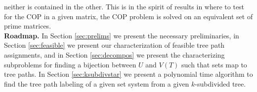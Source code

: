 \documentclass{fsttcs}
\def\cH{{\cal H}}
\def\F{{\mathcal F}}
\begin{document}
neither is contained in the other.  This is in the spirit of results
in \cite{wlh02,nsnrs09} where to test for the COP in a given matrix,
the COP problem is solved on an equivalent set of prime matrices.  \\
{\bf Roadmap.} In Section \ref{sec:prelims} we present the necessary
preliminaries, in Section \ref{sec:feasible} we present our
characterization of feasible tree path assignments, and in Section
\ref{sec:decompos} we present the characterizing subproblems for
finding a bijection between $U$ and $V(T)$ such that sets map to tree
paths. In Section \ref{sec:ksubdivstar} we present a polynomial time
algorithm to find the tree path labeling of a given set system from a
given $k$-subdivided tree.




\end{document}
